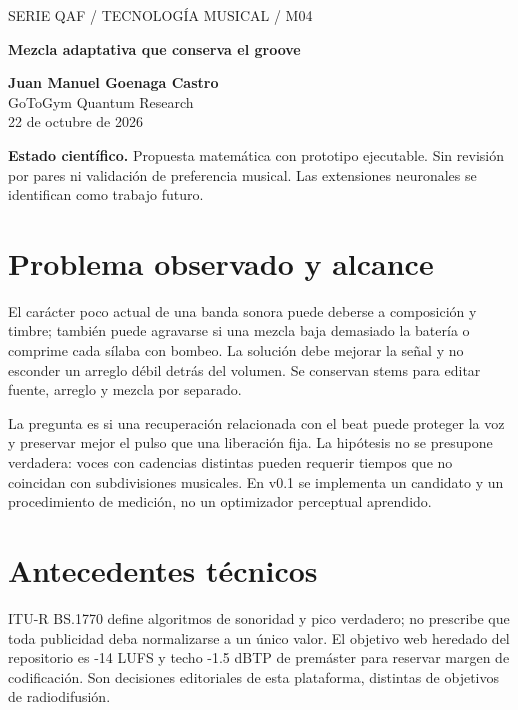 \documentclass[11pt,a4paper]{article}
\begin{document}
\begin{center}{\sffamily\small\textcolor{mint}{SERIE QAF / TECNOLOGÍA MUSICAL / M04}}\par\vspace{8pt}
{\sffamily\LARGE\bfseries\textcolor{ink}{Mezcla adaptativa que conserva el groove}}\par\vspace{10pt}
\textbf{Juan Manuel Goenaga Castro}\\GoToGym Quantum Research\\22 de octubre de 2026
\end{center}
\colorbox{ink!6}{\parbox{.96\linewidth}{\small\textbf{Estado científico.} Propuesta matemática con prototipo ejecutable. Sin revisión por pares ni validación de preferencia musical. Las extensiones neuronales se identifican como trabajo futuro.}}
\begin{abstract}
Se propone una integración de mezcla en la que la música mantiene presencia fuera de la voz y cede espacio durante el habla. El prototipo reutiliza el mezclador de cuatro stems con compresión sidechain y normalización medida en dos pasadas; añade liberación dependiente del tempo. La investigación diferencia sonoridad, enmascaramiento, bombeo y preferencia. La medición acústica no se presenta como demostración de inteligibilidad ni de modernidad.
\end{abstract}
\section{Problema observado y alcance}
El carácter poco actual de una banda sonora puede deberse a composición y timbre; también puede agravarse si una mezcla baja demasiado la batería o comprime cada sílaba con bombeo. La solución debe mejorar la señal y no esconder un arreglo débil detrás del volumen. Se conservan stems para editar fuente, arreglo y mezcla por separado.

La pregunta es si una recuperación relacionada con el beat puede proteger la voz y preservar mejor el pulso que una liberación fija. La hipótesis no se presupone verdadera: voces con cadencias distintas pueden requerir tiempos que no coincidan con subdivisiones musicales. En v0.1 se implementa un candidato y un procedimiento de medición, no un optimizador perceptual aprendido.
\section{Antecedentes técnicos}
ITU-R BS.1770 define algoritmos de sonoridad y pico verdadero; no prescribe que toda publicidad deba normalizarse a un único valor. El objetivo web heredado del repositorio es -14 LUFS y techo -1.5 dBTP de premáster para reservar margen de codificación. Son decisiones editoriales de esta plataforma, distintas de objetivos de radiodifusión.
\end{document}
